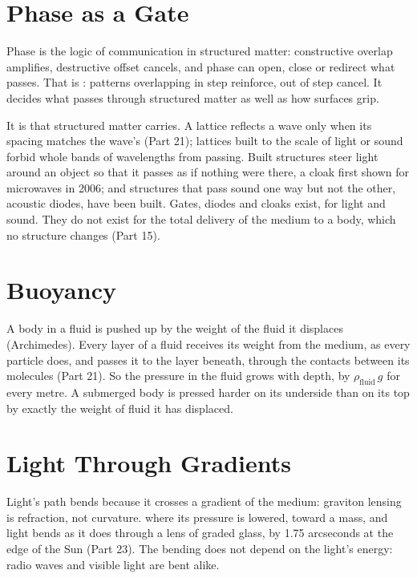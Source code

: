 \section{Phase as a Gate}

Phase is the logic of communication in structured matter: constructive overlap amplifies, destructive offset cancels, and phase can open, close or redirect what passes. That is : patterns overlapping in step reinforce, out of step cancel. It decides what passes through structured matter as well as how surfaces grip.

It is  that structured matter carries. A lattice reflects a wave only when its spacing matches the wave's (Part 21); lattices built to the scale of light or sound forbid whole bands of wavelengths from passing. Built structures steer light around an object so that it passes as if nothing were there, a cloak first shown for microwaves in 2006; and structures that pass sound one way but not the other, acoustic diodes, have been built. Gates, diodes and cloaks exist, for light and sound. They do not exist for the total delivery of the medium to a body, which no structure changes (Part 15).

\section{Buoyancy}

A body in a fluid is pushed up by the weight of the fluid it displaces (Archimedes).  Every layer of a fluid receives its weight from the medium, as every particle does, and passes it to the layer beneath, through the contacts between its molecules (Part 21). So the pressure in the fluid grows with depth, by $\rho_{\text{fluid}}\,g$ for every metre. A submerged body is pressed harder on its underside than on its top by exactly the weight of fluid it has displaced.

\section{Light Through Gradients}

Light's path bends because it crosses a gradient of the medium: graviton lensing is refraction, not curvature.  where its pressure is lowered, toward a mass, and light bends as it does through a lens of graded glass, by 1.75 arcseconds at the edge of the Sun (Part 23). The bending does not depend on the light's energy: radio waves and visible light are bent alike.

